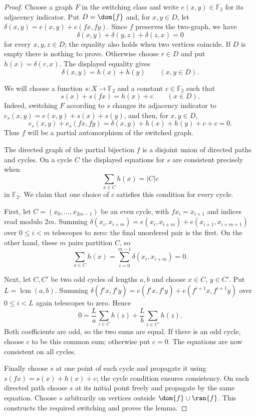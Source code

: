 %

\begin{proof}
Choose a graph $F$ in the switching class and write
$e(x,y)\in\mathbb F_2$ for its adjacency indicator.
Put $D=\dom{f}$ and, for $x,y\in D$, let
$\delta(x,y)=e(x,y)+e(fx,fy)$.
Since $f$ preserves the two-graph, we have
$$
\delta(x,y)+\delta(y,z)+\delta(z,x)=0
$$
for every $x,y,z\in D$; the equality also holds when two
vertices coincide. If $D$ is empty there is nothing to prove.
Otherwise choose $r\in D$ and put $h(x)=\delta(r,x)$.
The displayed equality gives
$$
\delta(x,y)=h(x)+h(y)\qquad(x,y\in D).
$$

We will choose a function $s:X\to\mathbb F_2$ and a constant
$c\in\mathbb F_2$ such that
$$
s(x)+s(fx)=h(x)+c\qquad(x\in D).
$$
Indeed, switching $F$ according to $s$ changes its adjacency
indicator to $e_s(x,y)=e(x,y)+s(x)+s(y)$, and then, for
$x,y\in D$,
$$
e_s(x,y)+e_s(fx,fy)
=\delta(x,y)+h(x)+h(y)+c+c=0.
$$
Thus $f$ will be a partial automorphism of the switched graph.

The directed graph of the partial bijection $f$ is a disjoint
union of directed paths and cycles. On a cycle $C$ the displayed
equations for $s$ are consistent precisely when
$$
\sum_{x\in C}h(x)=|C|c
$$
in $\mathbb F_2$. We claim that one choice of $c$ satisfies
this condition for every cycle.

First, let $C=(x_0,\ldots,x_{2m-1})$ be an even cycle, with
$fx_i=x_{i+1}$ and indices read modulo $2m$. Summing
$\delta(x_i,x_{i+m})=e(x_i,x_{i+m})
+e(x_{i+1},x_{i+m+1})$ over $0\le i<m$
telescopes to zero: the final unordered pair is the first.
On the other hand, these $m$ pairs partition $C$, so
$$
\sum_{x\in C}h(x)
=\sum_{i=0}^{m-1}\delta(x_i,x_{i+m})=0.
$$

Next, let $C,C'$ be two odd cycles of lengths $a,b$ and choose
$x\in C$, $y\in C'$. Put $L=\operatorname{lcm}(a,b)$.
Summing $\delta(f^ix,f^iy)
=e(f^ix,f^iy)+e(f^{i+1}x,f^{i+1}y)$
over $0\le i<L$ again telescopes to zero. Hence
$$
0=\frac La\sum_{z\in C}h(z)
 +\frac Lb\sum_{z\in C'}h(z).
$$
Both coefficients are odd, so the two sums are equal.
If there is an odd cycle, choose $c$ to be this common sum;
otherwise put $c=0$. The equations are now consistent on
all cycles.

Finally choose $s$ at one point of each cycle and propagate
it using $s(fx)=s(x)+h(x)+c$; the cycle condition ensures
consistency. On each directed path choose $s$ at its initial
point freely and propagate by the same equation. Choose
$s$ arbitrarily on vertices outside $\dom{f}\cup\ran{f}$.
This constructs the required switching and proves the lemma.
\end{proof}
